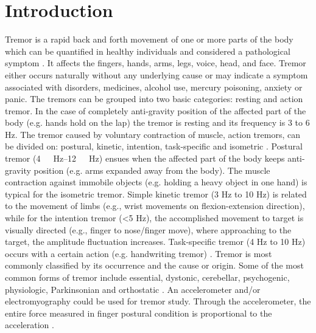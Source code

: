 \documentclass[conference, a4paper]{IEEEtran}
\begin{document}
\section{Introduction}
%
Tremor is a rapid back and forth movement of one or more parts of the body which can be quantified in healthy individuals and considered a pathological symptom \cite{RN8}. It affects the fingers, hands, arms, legs, voice, head, and face. Tremor either occurs naturally without any underlying cause or may indicate a symptom associated with disorders, medicines, alcohol use, mercury poisoning, anxiety or panic. The tremors can be grouped into two basic categories: resting and action tremor. In the case of completely anti-gravity position of the affected part of the body (e.g. hands hold on the lap) the tremor is resting and its frequency is 3 to 6 Hz. The tremor caused by voluntary contraction of muscle, action tremors, can be divided on: postural, kinetic, intention, task-specific and isometric \cite{RN7}. Postural tremor (\SIrange{4}{12}{\ Hz}) ensues when the affected part of the body keeps anti-gravity position (e.g. arms expanded away from the body). The muscle contraction against immobile objects (e.g. holding a heavy object in one hand) is typical for the isometric tremor. Simple kinetic tremor (3 Hz to 10 Hz) is related to the movement of limbs (e.g.,  wrist movements on flexion-extension direction), while for the intention tremor (<5 Hz),  the accomplished movement to target is visually directed (e.g., finger to nose/finger move), where approaching to the target, the amplitude fluctuation increases. Task-specific tremor (4 Hz to 10 Hz) occurs with a certain action (e.g. handwriting tremor) \cite{RN7}. Tremor is most commonly classified by its occurrence and the cause or origin.  Some of the most common forms of tremor include essential, dystonic, cerebellar, psychogenic, physiologic, Parkinsonian and orthostatic \cite{RN16,RN18}. An accelerometer and/or electromyography could be used for tremor study. Through the accelerometer, the entire force measured in finger postural condition  is proportional to the acceleration \cite{RN21}.
% 
\end{document}
